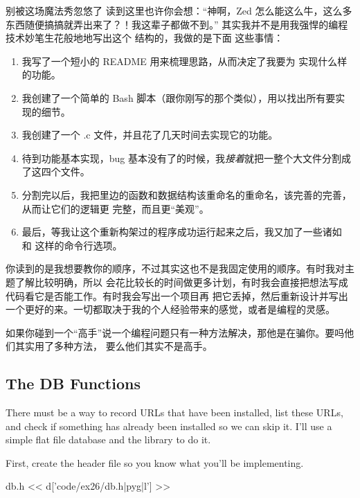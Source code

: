 \begin{aside}{别被这场魔法秀忽悠了}
读到这里也许你会想：“神啊，Zed 怎么能这么牛，这么多东西随便搞搞就弄出来了？！我这辈子都做不到。”
其实我并不是用我强悍的编程技术妙笔生花般地地写出这个  结构的，我做的是下面
这些事情：

\begin{enumerate}
\item 我写了一个短小的 README 用来梳理思路，从而决定了我要为  实现什么样
    的功能。
\item 我创建了一个简单的 Bash 脚本（跟你刚写的那个类似），用以找出所有要实现的细节。
\item 我创建了一个 .c 文件，并且花了几天时间去实现它的功能。
\item 待到功能基本实现，bug 基本没有了的时候，我\emph{接着}就把一整个大文件分割成了这四个文件。
\item 分割完以后，我把里边的函数和数据结构该重命名的重命名，该完善的完善，从而让它们的逻辑更
    完整，而且更“美观”。
\item 最后，等我让这个重新构架过的程序成功运行起来之后，我又加了一些诸如  和
     这样的命令行选项。
\end{enumerate}

你读到的是我想要教你的顺序，不过其实这也不是我固定使用的顺序。有时我对主题了解比较明确，所以
会花比较长的时间做更多计划，有时我会直接把想法写成代码看它是否能工作。有时我会写出一个项目再
把它丢掉，然后重新设计并写出一个更好的来。一切都取决于我的个人经验带来的感觉，或者是编程的灵感。

如果你碰到一个“高手”说一个编程问题只有一种方法解决，那他是在骗你。要吗他们其实用了多种方法，
要么他们其实不是高手。
\end{aside}

\subsection{The DB Functions}

There must be a way to record URLs that have been installed, list these
URLs, and check if something has already been installed so we can
skip it.  I'll use a simple flat file database and the 
library to do it.

First, create the  header file so you know what you'll be
implementing.

\begin{code}{db.h}
<< d['code/ex26/db.h|pyg|l'] >>
\end{code}

